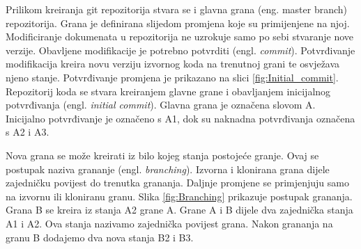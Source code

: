 \documentclass[times, utf8, diplomski, numeric]{fer}
\newcommand{\eng}[1]{(engl. \textit{#1})}
\begin{document}
Prilikom kreiranja git repozitorija stvara se i glavna grana (eng. master branch) repozitorija. Grana je definirana slijedom promjena koje su primijenjene na njoj. Modificiranje dokumenata u repozitorija ne uzrokuje samo po sebi stvaranje nove verzije. Obavljene modifikacije je potrebno potvrditi \eng{commit}. Potvrđivanje modifikacija kreira novu verziju izvornog koda na trenutnoj grani te osvježava njeno stanje. Potvrđivanje promjena je prikazano na slici \ref{fig:Initial_commit}. Repozitorij koda se stvara kreiranjem glavne grane i obavljanjem inicijalnog potvrđivanja \eng{initial commit}. Glavna grana je označena slovom A. Inicijalno potvrđivanje je označeno s A1, dok su naknadna potvrđivanja označena s A2 i A3.

Nova grana se može kreirati iz bilo kojeg stanja postojeće granje. Ovaj se postupak naziva grananje \eng{branching}. Izvorna i klonirana grana dijele zajedničku povijest do trenutka grananja. Daljnje promjene se primjenjuju samo na izvornu ili kloniranu granu. Slika \ref{fig:Branching} prikazuje postupak grananja. Grana B se kreira iz stanja A2 grane A. Grane A i B dijele dva zajednička stanja A1 i A2. Ova stanja nazivamo zajednička povijest grana. Nakon grananja na granu B dodajemo dva nova stanja B2 i B3.
\end{document}
